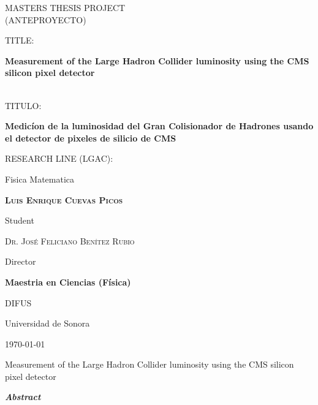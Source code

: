 \documentclass[final,12pt]{article}
\def\Student{Luis Enrique Cuevas Picos}
\def\Title{MASTERS THESIS PROJECT}
\def\TitleESP{(ANTEPROYECTO)}
\def\Prog{Maestria en Ciencias (F\'{i}sica) }
\def\Dept{DIFUS}
\def\Institution{Universidad de Sonora}
\def\Director{Dr. Jos\'{e} Feliciano Ben\'{i}tez Rubio}
\def\ProjectTitle{Measurement of the Large Hadron Collider luminosity using the CMS silicon pixel detector}
\def\ProjectTitleESP{Medic\'{i}on de la luminosidad del Gran Colisionador de Hadrones usando el detector de pixeles de silicio de CMS}
\def\ResearchLine{Fisica Matematica}
\begin{document}
\onehalfspacing

\begin{titlepage}
\centering
\hspace{0pt}
{\scshape\Large \Title \\ \TitleESP \par}
  
  \vspace{1cm}
  {
    TITLE:\par
    {\bf \large \ProjectTitle  \par}
    \\
    \vspace{0.4cm}
    TITULO:\par
    {\bf \large \ProjectTitleESP \par}
  }
       
  \vspace{1cm}
  {
    RESEARCH LINE (LGAC): \par
    \ResearchLine \par
  }
        
  \vspace{2cm}
  {\underline{\hspace{8cm}}\par}
  {\bf \scshape \Student \par}
  {Student\par}

  \vspace{1cm}
  {\underline{\hspace{8cm}}\par}
  {\scshape \Director \par}
  {Director\par}

  \vspace{1cm}
  {\bf \Prog \par}
  {\Dept \par}
  {\Institution \par}

  \vspace{2cm}
  {\today}

\hspace{0pt}
\vfill

\end{titlepage}


\shipout\null


\newpage
\hspace{2pt}
\vfill

  \begin{center}
    {\Large \ProjectTitle \par}
    \vspace{1cm}
    {\itshape\textbf{Abstract}\par}
  \end{center}
  
\end{document}
